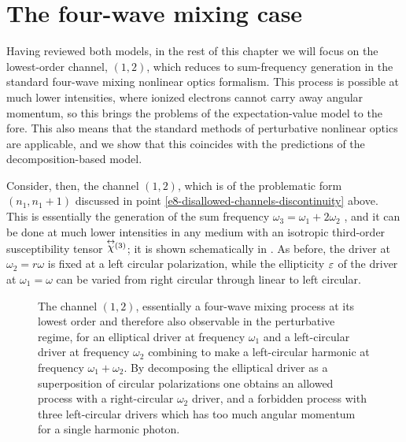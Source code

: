\section{The four-wave mixing case}
\label{sec:four-wave-mixing}

Having reviewed both models, in the rest of this chapter we will focus on the lowest-order channel, $(1,2)$, which reduces to sum-frequency generation in the standard four-wave mixing nonlinear optics formalism. This process is possible at much lower intensities, where ionized electrons cannot carry away angular momentum, so this brings the problems of the expectation-value model to the fore. This also means that the standard methods of perturbative nonlinear optics are applicable, and we show that this coincides with the predictions of the decomposition-based model.

Consider, then, the channel $(1,2)$, which is of the problematic form $(n_1,n_1+1)$ discussed in point \ref{e8-disallowed-channels-discontinuity} above. This is essentially the generation of the sum frequency $\omega_3=\omega_1+2\omega_2$ \cite{BloembergenSecondHarmonic}, and it can be done at much lower intensities in any medium with an isotropic third-order susceptibility tensor $\stackrel{\leftrightarrow}{\chi}\!\!{}^{(3)}$; it is shown schematically in . As before, the driver at $\omega_2=r\omega$ is fixed at a left circular polarization, while the ellipticity $\varepsilon$ of the driver at $\omega_1=\omega$ can be varied from right circular through linear to left circular.




\begin{figure}[ht]
  \centering
  
  
  \vspace{3mm}
  \caption[
  Feynman diagram for the $(1,2)$ channel in bicircular HHG with one elliptical and one circular driver
  ]{
  The channel $(1,2)$, essentially a four-wave mixing process at its lowest order and therefore also observable in the perturbative regime, for an elliptical driver at frequency $\omega_1$ and a left-circular driver at frequency $\omega_2$ combining to make a left-circular harmonic at frequency $\omega_1+\omega_2$. By decomposing the elliptical driver as a superposition of circular polarizations one obtains an allowed process with a right-circular $\omega_2$ driver, and a forbidden process with three left-circular drivers which has too much angular momentum for a single harmonic photon.
  }
\label{f8-four-wave-mixing-diagram}
\end{figure}






